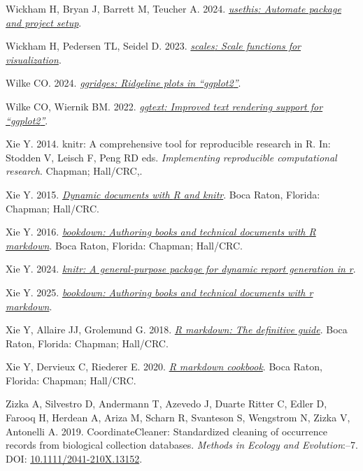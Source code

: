 \documentclass[10pt,a4paper]{article}
\newlength{\cslhangindent}
\newenvironment{CSLReferences}[2] %
 {\begin{list}{}{%
  \setlength{\itemindent}{0pt}
  \setlength{\leftmargin}{0pt}
  \setlength{\parsep}{0pt}
  \ifodd #1
   \setlength{\leftmargin}{\cslhangindent}
   \setlength{\itemindent}{-1\cslhangindent}
  \fi
  \setlength{\itemsep}{#2\baselineskip}}}
 {\end{list}}
\begin{document}
\begin{CSLReferences}{1}{0}
Wickham H, Bryan J, Barrett M, Teucher A. 2024. \emph{\href{https://CRAN.R-project.org/package=usethis}{{usethis}: Automate package and project setup}}.

Wickham H, Pedersen TL, Seidel D. 2023. \emph{\href{https://CRAN.R-project.org/package=scales}{{scales}: Scale functions for visualization}}.

Wilke CO. 2024. \emph{\href{https://CRAN.R-project.org/package=ggridges}{{ggridges}: Ridgeline plots in {``{ggplot2}''}}}.

Wilke CO, Wiernik BM. 2022. \emph{\href{https://CRAN.R-project.org/package=ggtext}{{ggtext}: Improved text rendering support for {``{ggplot2}''}}}.

Xie Y. 2014. {knitr}: A comprehensive tool for reproducible research in {R}. In: Stodden V, Leisch F, Peng RD eds. \emph{Implementing reproducible computational research}. Chapman; Hall/CRC,.

Xie Y. 2015. \emph{\href{https://yihui.org/knitr/}{Dynamic documents with {R} and knitr}}. Boca Raton, Florida: Chapman; Hall/CRC.

Xie Y. 2016. \emph{\href{https://bookdown.org/yihui/bookdown}{{bookdown}: Authoring books and technical documents with {R} markdown}}. Boca Raton, Florida: Chapman; Hall/CRC.

Xie Y. 2024. \emph{\href{https://yihui.org/knitr/}{{knitr}: A general-purpose package for dynamic report generation in r}}.

Xie Y. 2025. \emph{\href{https://github.com/rstudio/bookdown}{{bookdown}: Authoring books and technical documents with r markdown}}.

Xie Y, Allaire JJ, Grolemund G. 2018. \emph{\href{https://bookdown.org/yihui/rmarkdown}{R markdown: The definitive guide}}. Boca Raton, Florida: Chapman; Hall/CRC.

Xie Y, Dervieux C, Riederer E. 2020. \emph{\href{https://bookdown.org/yihui/rmarkdown-cookbook}{R markdown cookbook}}. Boca Raton, Florida: Chapman; Hall/CRC.

Zizka A, Silvestro D, Andermann T, Azevedo J, Duarte Ritter C, Edler D, Farooq H, Herdean A, Ariza M, Scharn R, Svanteson S, Wengstrom N, Zizka V, Antonelli A. 2019. CoordinateCleaner: Standardized cleaning of occurrence records from biological collection databases. \emph{Methods in Ecology and Evolution}:--7. DOI: \href{https://doi.org/10.1111/2041-210X.13152}{10.1111/2041-210X.13152}.

\end{CSLReferences}
\end{document}
